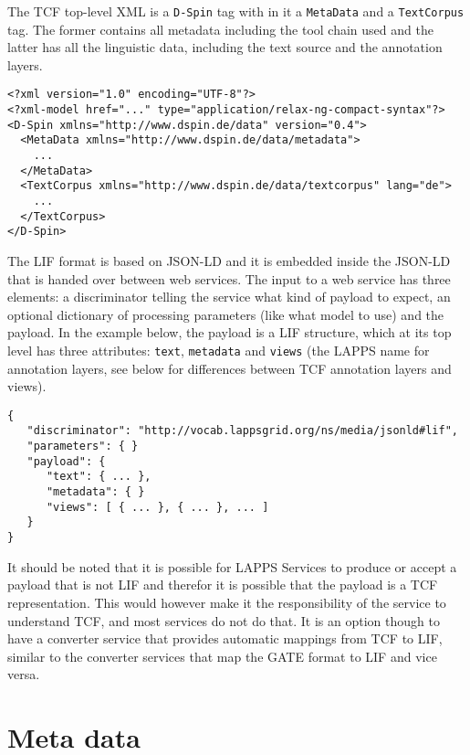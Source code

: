 \documentclass[11pt]{article}
\newcommand{\tag}[1]{{\tt #1}}
\newenvironment{example}
    {\begin{tcolorbox}\small}
    {\end{tcolorbox}}
\begin{document}
The TCF top-level XML is a \tag{D-Spin} tag with in it a \tag{MetaData} and a \tag{TextCorpus} tag. The former contains all metadata including the tool chain used and the latter has all the linguistic data, including the text source and the annotation layers.

\begin{example}
\begin{verbatim}
<?xml version="1.0" encoding="UTF-8"?>
<?xml-model href="..." type="application/relax-ng-compact-syntax"?>
<D-Spin xmlns="http://www.dspin.de/data" version="0.4">
  <MetaData xmlns="http://www.dspin.de/data/metadata">
    ...
  </MetaData>
  <TextCorpus xmlns="http://www.dspin.de/data/textcorpus" lang="de">
    ...
  </TextCorpus>
</D-Spin>
\end{verbatim}
\end{example}

The LIF format is based on JSON-LD and it is embedded inside the JSON-LD that is handed over between web services. The input to a web service has three elements: a discriminator telling the service what kind of payload to expect, an optional dictionary of processing parameters (like what model to use) and the payload. In the example below, the payload is a LIF structure, which at its top level has three attributes: \tag{text}, \tag{metadata} and \tag{views} (the LAPPS name for annotation layers, see below for differences between TCF annotation layers and views). 

\begin{example}
\begin{verbatim}
{  
   "discriminator": "http://vocab.lappsgrid.org/ns/media/jsonld#lif",
   "parameters": { }
   "payload": { 
      "text": { ... },
      "metadata": { }
      "views": [ { ... }, { ... }, ... ] 
   }
}
\end{verbatim}
\end{example}

It should be noted that it is possible for LAPPS Services to produce or accept a payload that is not LIF and therefor it is possible that the payload is a TCF representation. This would however make it the responsibility of the service to understand TCF, and most services do not do that. It is an option though to have a converter service that provides automatic mappings from TCF to LIF, similar to the converter services that map the GATE format to LIF and vice versa.


\section{Meta data}
\end{document}
